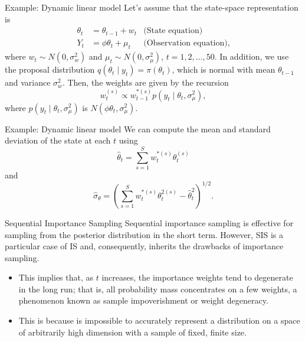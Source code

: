 \documentclass[12pt, compress]{beamer}
\begin{document}
\begin{frame}{Example: Dynamic linear model}
Let's assume that the state-space representation is  
\begin{align*}
	{\theta}_t &= {\theta}_{t-1} + {w}_t & \text{(State equation)} \nonumber\\
	Y_t & = \phi {\theta}_t + \mu_t & \text{(Observation equation)},
\end{align*}
where ${w}_t\sim N(0, \sigma_w^2)$ and $\mu_t\sim N(0,\sigma_{\mu}^2)$, $t=1,2,\dots,50$. In addition, we use the proposal distribution $q(\theta_t\mid y_t)=\pi(\theta_t)$, which is normal with mean $\theta_{t-1}$ and variance $\sigma_w^2$. Then, the weights are given by the recursion  
\[ 
w_t^{(s)} \propto w_{t-1}^{*(s)} p(y_t\mid \theta_t,\sigma_{\mu}^2), 
\]  
where $p(y_t\mid \theta_t,\sigma_{\mu}^2)$ is $N(\phi \theta_t, \sigma_{\mu}^2)$.   
\end{frame}


\begin{frame}{Example: Dynamic linear model}
	We can compute the mean and standard deviation of the state at each $t$ using  
	\[
	\hat{\theta}_t = \sum_{s=1}^S w_t^{*(s)} \theta_t^{(s)}
	\]  
	and  
	\[
	\hat{\sigma}_{\theta} = \left(\sum_{s=1}^S w_t^{*(s)} \theta_t^{2(s)} - \hat{\theta}_t^2\right)^{1/2}.
	\]  
\end{frame}

\begin{frame}{Sequential Importance Sampling}
Sequential importance sampling is effective for sampling from the posterior distribution in the short term. However, SIS is a particular case of IS and, consequently, inherits the drawbacks of importance sampling. 
\begin{itemize}
	\item This implies that, as $t$ increases, the importance weights tend to degenerate in the long run; that is, all probability mass concentrates on a few weights, a phenomenon known as sample impoverishment or weight degeneracy.
	\item This is because is impossible to accurately
	represent a distribution on a space of arbitrarily high dimension with a sample of fixed, finite size. 
\end{itemize}
\end{frame}
\end{document}
